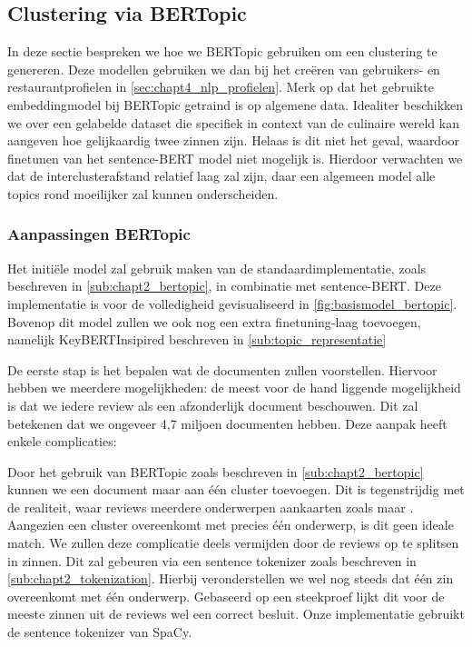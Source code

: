 \subsection{Clustering via BERTopic}
In deze sectie bespreken we hoe we BERTopic gebruiken om een clustering te genereren. Deze modellen gebruiken we dan bij het creëren van gebruikers- en restaurantprofielen in \autoref{sec:chapt4_nlp_profielen}. Merk op dat het gebruikte embeddingmodel bij BERTopic getraind is op algemene data. Idealiter beschikken we over een gelabelde dataset die specifiek in context van de culinaire wereld kan aangeven hoe gelijkaardig twee zinnen zijn. Helaas is dit niet het geval, waardoor finetunen van het sentence-BERT model niet mogelijk is. Hierdoor verwachten we dat de interclusterafstand relatief laag zal zijn, daar een algemeen model alle topics rond  moeilijker zal kunnen onderscheiden.

\subsubsection{Aanpassingen BERTopic}
Het initiële model zal gebruik maken van de standaardimplementatie, zoals beschreven in \autoref{sub:chapt2_bertopic}, in combinatie met sentence-BERT. Deze implementatie is voor de volledigheid gevisualiseerd in \autoref{fig:basismodel_bertopic}. Bovenop dit model zullen we ook nog een extra finetuning-laag toevoegen, namelijk KeyBERTInsipired beschreven in \autoref{sub:topic_representatie}


De eerste stap is het bepalen wat de documenten zullen voorstellen. Hiervoor hebben we meerdere mogelijkheden: de meest voor de hand liggende mogelijkheid is dat we iedere review als een afzonderlijk document beschouwen. Dit zal betekenen dat we ongeveer 4,7 miljoen documenten hebben. Deze aanpak heeft enkele complicaties:

Door het gebruik van BERTopic zoals beschreven in \autoref{sub:chapt2_bertopic} kunnen we een document maar aan één cluster toevoegen. Dit is tegenstrijdig met de realiteit, waar reviews meerdere onderwerpen aankaarten zoals  maar . Aangezien een cluster overeenkomt met precies één onderwerp, is dit geen ideale match. We zullen deze complicatie deels vermijden door de reviews op te splitsen in zinnen. Dit zal gebeuren via een sentence tokenizer zoals beschreven in \autoref{sub:chapt2_tokenization}. Hierbij veronderstellen we wel nog steeds dat één zin overeenkomt met één onderwerp. Gebaseerd op een steekproef lijkt dit voor de meeste zinnen uit de reviews wel een correct besluit. Onze implementatie gebruikt de sentence tokenizer van SpaCy. \cite{spacy_main}

